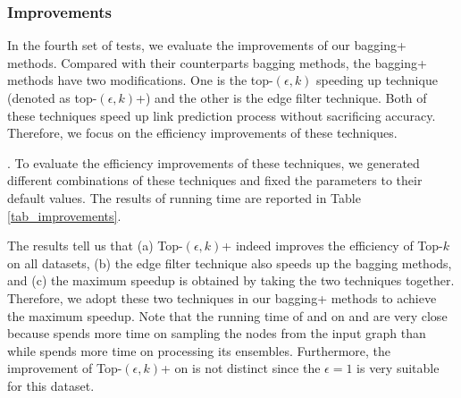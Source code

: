 \subsubsection{Improvements}
In the fourth set of tests, we evaluate the improvements of our bagging+ methods.
Compared with their counterparts bagging methods, the bagging+ methods have two modifications.
One is the top-$(\epsilon, k)$ speeding up technique (denoted as top-$(\epsilon, k)$+)
and the other is the edge filter technique.
Both of these techniques speed up link prediction process without sacrificing accuracy.
Therefore, we focus on the efficiency improvements of these techniques.


. To evaluate the
efficiency improvements of these techniques, we generated different combinations
of these techniques and fixed the parameters to their default values.
The results of running time are reported in Table \ref{tab_improvements}.

The results tell us that (a) Top-$(\epsilon, k)$+ indeed improves
the efficiency of Top-$k$ on all datasets,
(b) the edge filter technique also speeds up the bagging methods,
and (c) the maximum speedup is obtained by taking the
two techniques together. Therefore, we adopt these two techniques
in our bagging+ methods to achieve the maximum speedup.
Note that the running time of \Biasedp and \Nodep on \YouTube and \Wikipedia
are very close because \Biasedp spends more time on sampling the nodes
from the input graph than \Nodep while \Nodep spends more time on processing
its ensembles. Furthermore, the improvement of Top-$(\epsilon, k)$+ on \Wikipedia is not
distinct since the $\epsilon = 1$ is very suitable for this dataset.

